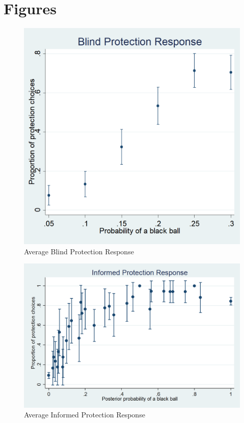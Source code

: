 \documentclass[11pt,a4paper]{article}
\begin{document}
%


\section{Figures}

\begin{figure}[H]
\centering
\caption{Average Blind Protection Response} \label{Blind Protection Responses}

  \centering
  \includegraphics[scale=0.3]{Graphs/blind_prot_sta.png}

\end{figure}

\begin{figure}[H]
\centering
\caption{Average Informed Protection Response} \label{Informed Protection Responses}

  \centering
  \includegraphics[scale=0.3]{Graphs/ip_response.png}

\end{figure}
\end{document}
